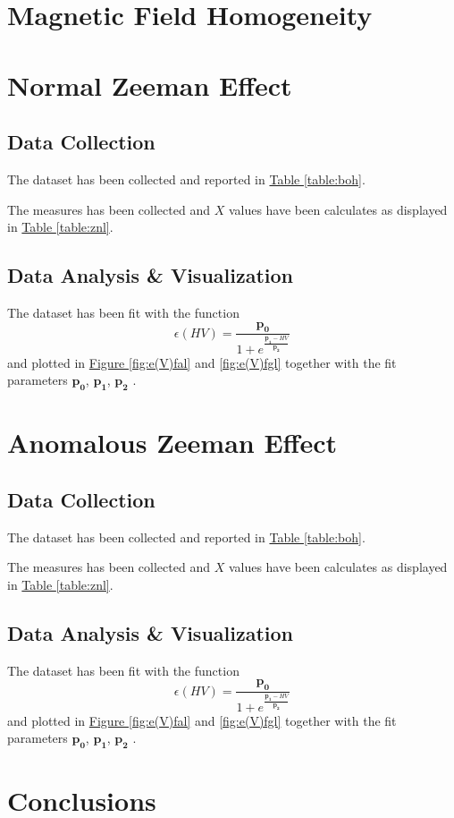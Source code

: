 \documentclass[a4paper,12pt,abstracton]{scrartcl}
\begin{document}
\section{Magnetic Field Homogeneity}


\section{Normal Zeeman Effect}

\subsection{Data Collection}
The dataset has been collected and reported in \hyperref[table:boh]{Table \ref*{table:boh}}. \newline 

The measures has been collected and $X$ values have been calculates as displayed in \hyperref[table:znl]{Table \ref*{table:znl}}.

\subsection{Data Analysis \& Visualization}
The dataset has been fit with the function $$\epsilon(HV)=\frac{\boldsymbol{p_0}}{1+e^{\frac{\boldsymbol{p_1}-HV}{\boldsymbol{p_2}}}}$$
and plotted in \hyperref[fig:e(V)fal]{Figure \ref*{fig:e(V)fal}} and \hyperref[fig:e(V)fgl]{ \ref*{fig:e(V)fgl}}  together with the fit parameters $\boldsymbol{p_0}$, $\boldsymbol{p_1}$, $\boldsymbol{p_2}$ .
\section{Anomalous Zeeman Effect}


\subsection{Data Collection}
The dataset has been collected and reported in \hyperref[table:boh]{Table \ref*{table:boh}}. \newline 

The measures has been collected and $X$ values have been calculates as displayed in \hyperref[table:znl]{Table \ref*{table:znl}}.

\subsection{Data Analysis \& Visualization}
The dataset has been fit with the function $$\epsilon(HV)=\frac{\boldsymbol{p_0}}{1+e^{\frac{\boldsymbol{p_1}-HV}{\boldsymbol{p_2}}}}$$
and plotted in \hyperref[fig:e(V)fal]{Figure \ref*{fig:e(V)fal}} and \hyperref[fig:e(V)fgl]{ \ref*{fig:e(V)fgl}}  together with the fit parameters $\boldsymbol{p_0}$, $\boldsymbol{p_1}$, $\boldsymbol{p_2}$ .

\section{Conclusions}


%
%
\end{document}
